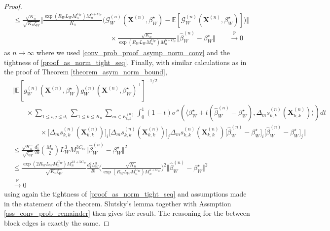 \documentclass[10pt,a4paper]{amsart}
\begin{document}
\begin{proof}
\begin{align*}
    & \leq \frac{\sqrt{K_n}}{\sqrt{K_n \zeta_W}} \bigg\Vert \frac{\exp(R_WL_WM_n^{C_W}) M_n^{5+C_W}}{K_n} \big( \mathcal{G}_W^{(n)}(\mathbf{X}^{(n)},\beta_W^{\star}) - \mathbb{E}[\mathcal{G}_W^{(n)}(\mathbf{X}^{(n)},\beta_W^{\star})] \big) \bigg\Vert \\
    & \qquad \qquad \qquad \qquad \qquad \qquad \qquad \times \frac{\sqrt{K_n}}{\exp(R_WL_WM_n^{C_W}) M_n^{5+C_W}} \Vert \hat{\beta}_W^{(n)} - \beta_W^{\star} \Vert  \qquad \xrightarrow{\mathbb{P}} 0 
\end{align*}
as $n \rightarrow \infty$ where we used \eqref{conv_prob_proof_asymp_norm_conv} and the tightness of \eqref{proof_as_norm_tight_seq}. Finally, with similar calculations as in the proof of Theorem \ref{theorem_asym_norm_bound},
\begin{align*}
    &\bigg\Vert \mathbb{E}[g_W^{(n)}(\mathbf{X}^{(n)},\beta_W^{\star})g_W^{(n)}(\mathbf{X}^{(n)},\beta_W^{\star})^{\top}]^{-1/2} \\
    & \qquad \times \sum_{1 \leq i,j \leq d_1} \sum_{1\leq k \leq K_n} \sum_{m \in E_{k,k}^{(n)}} \int_0^1 (1-t) \sigma'' ( \langle \beta_W^{\star} + t(\hat{\beta}_W^{(n)} - \beta_W^{\star}) , \Delta_m s_{k,k}^{(n)}(\mathbf{X}_{k,k}^{(n)}) \rangle )dt  \\
    & \qquad \qquad \times \big[\Delta_m s_{k,k}^{(n)}(\mathbf{X}_{k,k}^{(n)}) \big]_i \big[\Delta_m s_{k,k}^{(n)}(\mathbf{X}_{k,k}^{(n)}) \big]_j \Delta_m s_{k,k}^{(n)}(\mathbf{X}_{k,k}^{(n)})  \big[ \hat{\beta}_W^{(n)}-\beta_W^{\star}\big]_i \big[ \hat{\beta}_W^{(n)}-\beta_W^{\star}\big]_j \bigg\Vert \\
    &\leq  \frac{\sqrt{K_n}}{\sqrt{ \zeta_W}} \frac{d_1^2}{20} \binom{M_n}{2}  L_W^3 M_n^{3C_W}  \Vert \hat{\beta}_W^{(n)}-\beta_W^{\star}\Vert^2 \\
    & \leq  \frac{\exp(2R_WL_WM_n^{C_W}) M_n^{12+5C_W}}{\sqrt{ K_n \zeta_W}} \frac{d_1^2 L_W^3 }{20} \bigg(\frac{\sqrt{K_n}}{\exp(R_WL_WM_n^{C_W}) M_n^{5+C_W}} \bigg)^2  \Vert \hat{\beta}_W^{(n)}-\beta_W^{\star}\Vert^2  \\
    & \xrightarrow{\mathbb{P}} 0 
\end{align*}
using again the tightness of \eqref{proof_as_norm_tight_seq} and assumptions made in the statement of the theorem. Slutsky's lemma together with Assmption \ref{ass_conv_prob_remainder} then gives the result. The reasoning for the between-block edges is exactly the same.
\end{proof}
\end{document}
